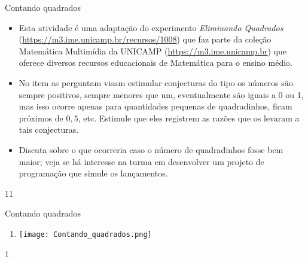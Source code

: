 \begin{sugestions}{Contando quadrados}
{
	\begin{itemize}
	\item Esta atividade é uma adaptação do experimento \textit{Eliminando Quadrados} (\url {https://m3.ime.unicamp.br/recursos/1008}) que faz parte da coleção  Matemática Multimídia da UNICAMP (\url{https://m3.ime.unicamp.br}) que oferece diversos recursos educacionais de Matemática para o ensino médio.
	\item No item  as perguntam visam estimular conjecturas do tipo os números são sempre positivos, sempre menores que um, eventualmente são iguais a 0 ou 1, mas isso ocorre apenas para quantidades pequenas de quadradinhos, ficam próximos de $0{,}5$, etc. Estimule que eles registrem as razões que os levaram a tais conjecturas.
	\item Discuta sobre o que ocorreria caso o número de quadradinhos fosse bem maior; veja se há interesse na turma em desenvolver um projeto de programação que simule os lançamentos.
	\end{itemize}
}{1}{1}
\end{sugestions}
\begin{answer}{Contando quadrados}
{
	\begin{enumerate}
	\item {} 
	{
	\texttt{[image: Contando\_quadrados.png]}
	}

	\end{enumerate}
}{1}
\end{answer}
\clearmargin
